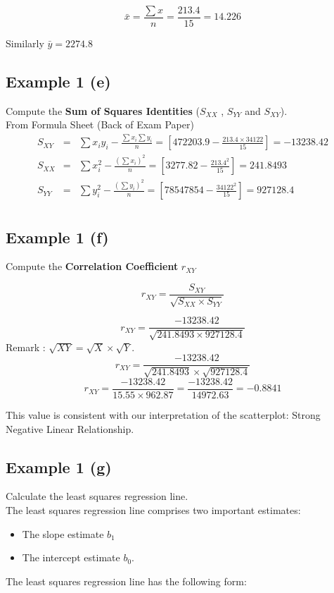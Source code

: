 \documentclass[]{report}
\begin{document}
\[ \bar{x} = \frac{\sum x}{n} = \frac{213.4}{15} = 14.226 \]

Similarly $\bar{y} =  2274.8$



\subsection{Example 1 (e)}
Compute the \textbf{Sum of Squares Identities} ($S_{XX}$ , $S_{YY}$ and $S_{XY}$).\\

\bigskip
From Formula Sheet (Back of Exam Paper)
\begin{eqnarray*}
	S_{XY} &=&
	\sum x_iy_i - \frac{\sum x_i\sum y_i}{n} = \left[472203.9 - \frac{213.4 \times 34122}{15} \right]=  -13238.42\\
	S_{XX} &=&
	\sum x_i^2 - \frac{(\sum x_i)^2}{n} = \left[3277.82 - \frac{213.4^2}{15}\right] =  241.8493\\
	S_{YY} &=&
	\sum y_i^2 - \frac{(\sum y_i)^2}{n} = \left[78547854 - \frac{34122^2}{15}\right] = 927128.4\\
\end{eqnarray*}




\subsection{Example 1 (f)}
Compute the \textbf{Correlation Coefficient} $r_{XY}$

\[r_{XY} =  \frac{S_{XY}}{\sqrt{S_{XX} \times S_{YY}}} \]

\[r_{XY} =  \frac{-13238.42}{\sqrt{241.8493 \times 927128.4}} \]
Remark : $\sqrt{XY} = \sqrt{X} \times \sqrt{Y}$.
\[r_{XY} =  \frac{-13238.42}{\sqrt{241.8493} \times \sqrt{927128.4}} \]
\[r_{XY} =  \frac{-13238.42}{15.55 \times 962.87} = \frac{-13238.42}{14972.63} = -0.8841 \]

This value is consistent with our interpretation of the scatterplot: Strong Negative Linear Relationship.



\subsection{Example 1 (g)}
Calculate the least squares regression line.\\
\bigskip
The least squares regression line comprises two important estimates:
\begin{itemize}
	\item  The slope estimate $b_1$
	\item  The intercept estimate $b_0$.
\end{itemize}
The least squares regression line has the following form:
\end{document}
